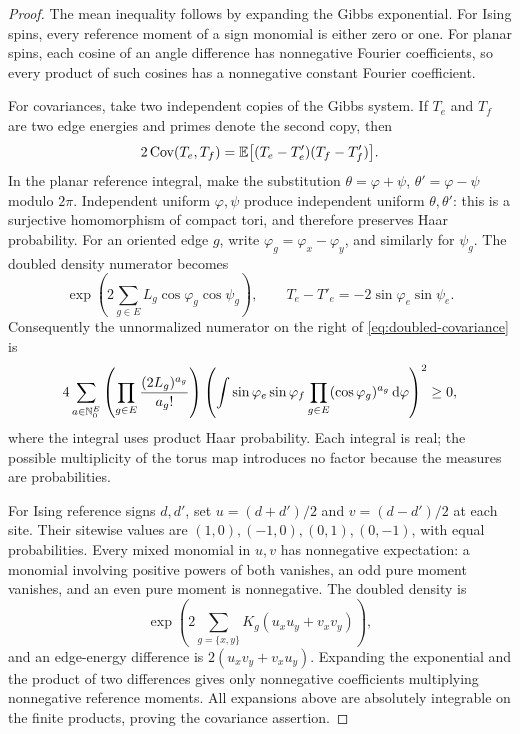 \begin{proof}
The mean inequality follows by expanding the Gibbs exponential.
For Ising spins, every reference moment of a sign monomial is either
zero or one.  For planar spins, each cosine of an angle difference has
nonnegative Fourier coefficients, so every product of such cosines
has a nonnegative constant Fourier coefficient.

For covariances, take two independent copies of the Gibbs system.
If $T_e$ and $T_f$ are two edge energies and primes denote the second
copy, then
\begin{equation}\label{eq:doubled-covariance}
 2\operatorname{Cov}(T_e,T_f)
 =\mathbb E\big[(T_e-T'_e)(T_f-T'_f)\big].
\end{equation}
In the planar reference integral, make the substitution
$\theta=\varphi+\psi$, $\theta'=\varphi-\psi$ modulo $2\pi$.
Independent uniform $\varphi,\psi$ produce independent uniform
$\theta,\theta'$: this is a surjective homomorphism of compact tori,
and therefore preserves Haar probability.  For an oriented edge $g$,
write $\varphi_g=\varphi_x-\varphi_y$, and similarly for $\psi_g$.
The doubled density numerator becomes
\[
 \exp\left(2\sum_{g\in E}L_g\cos\varphi_g\cos\psi_g\right),
 \qquad T_e-T'_e=-2\sin\varphi_e\sin\psi_e.
\]
Consequently the unnormalized numerator on the right of
\eqref{eq:doubled-covariance} is
\[
 4\sum_{a\in\mathbb N_0^E}
 \left(\prod_{g\in E}\frac{(2L_g)^{a_g}}{a_g!}\right)
 \left(
  \int\sin\varphi_e\sin\varphi_f
       \prod_{g\in E}(\cos\varphi_g)^{a_g}\,\mathrm d\varphi
 \right)^2\geq0,
\]
where the integral uses product Haar probability.  Each integral is
real; the possible multiplicity of the torus map introduces no factor
because the measures are probabilities.

For Ising reference signs $d,d'$, set
$u=(d+d')/2$ and $v=(d-d')/2$ at each site.  Their sitewise values are
$(1,0),(-1,0),(0,1),(0,-1)$, with equal probabilities.  Every mixed
monomial in $u,v$ has nonnegative expectation: a monomial involving
positive powers of both vanishes, an odd pure moment vanishes, and
an even pure moment is nonnegative.  The doubled density is
\[
 \exp\left(2\sum_{g=\{x,y\}}K_g(u_xu_y+v_xv_y)\right),
\]
and an edge-energy difference is $2(u_xv_y+v_xu_y)$.
Expanding the exponential and the product of two differences gives
only nonnegative coefficients multiplying nonnegative reference
moments.  All expansions above are absolutely integrable on the finite
products, proving the covariance assertion.
\end{proof}

